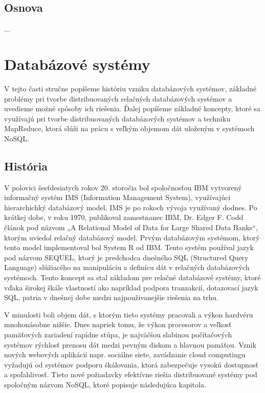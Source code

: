 \documentclass[11pt,twoside,a4paper]{book}
\begin{document}
\section{Osnova}
...

\chapter{Databázové systémy}

V tejto časti stručne popíšeme históriu vzniku databázových systémov, základné problémy pri tvorbe distribuovaných relačných databázových systémov a uvedieme možné spôsoby ich riešenia. Ďalej popíšeme základné koncepty, ktoré sa využívajú pri tvorbe distribuovaných databázových systémov a techniku MapReduce, ktorá slúži na prácu s veľkým objemom dát uloženým v systémoch NoSQL.

\section{História}

V polovici šesťdesiatych rokov 20. storočia bol spoločnosťou IBM vytvorený informačný systém IMS (Information Management System), využívajúci hierarchichký databázový model. IMS je po rokoch vývoja využívaný dodnes. Po krátkej dobe, v roku 1970, publikoval zamestnanec IBM, Dr. Edger F. Codd \cite{Codd} článok pod názvom „A Relational Model of Data for Large Shared Data Banks“, ktorým uviedol relačný databázový model. Prvým databázovým systémom, ktorý tento model implementoval bol System R od IBM. Tento systém používal jazyk pod názvom SEQUEL, ktorý je predchodca dnešného SQL (Structured Query Language) slúžiacého na manipuláciu a definícu dát v relačných databázových systémoch. Tento koncept sa stal základom pre relačné databázové systémy, ktoré vďaka širokej škále vlastností ako napríklad podpora tranzakcií, dotazovací jazyk SQL, patria v dnešnej  dobe medzi najpouživanejšie riešenia na trhu.

V minulosti boli objem dát, s ktorým tieto systémy pracovali a výkon hardvéru mnohonásobne nižšie. Dnes napriek tomu, že výkon procesorov a veľkosť pamäťových zariadení rapídne stúpa, je najväčšou slabinou počítačových systémov rýchlosť prenosu dát medzi pevným diskom a hlavnou pamäťou. Vznik nových webových aplikácií napr. sociálne siete, zavádzanie cloud computingu vyžadujú od systémov podporu škálovania, ktorá zabezpečuje vysokú dostupnosť a spoľahlivosť. Tieto nové požiadavky efektívne riešia distribuované systémy pod spoločným názvom NoSQL, ktoré popisuje následujúca kapitola.
\end{document}
